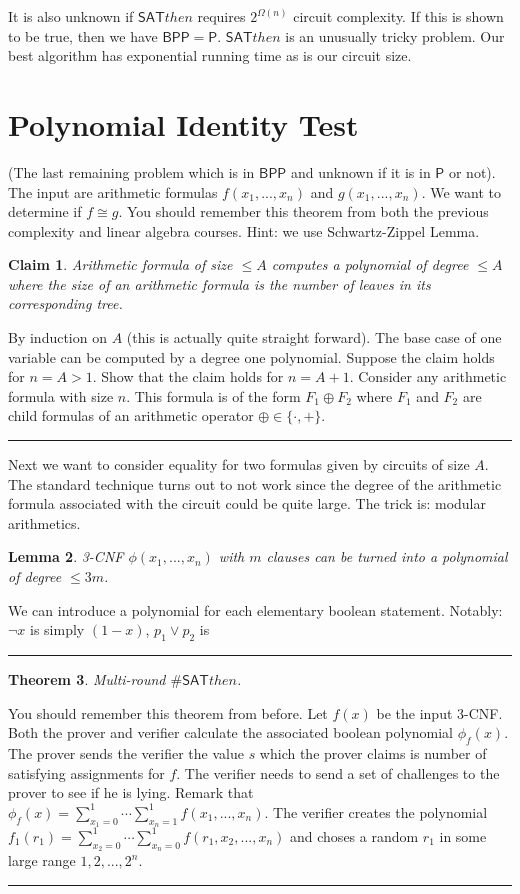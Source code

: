 \documentclass[twoside]{article}
\newcounter{lecnum}
\newtheorem{theorem}{Theorem}[lecnum]
\newtheorem{lemma}[theorem]{Lemma}
\newtheorem{claim}[theorem]{Claim}
\newenvironment{proof}{{\bf Proof:}}{\hfill\rule{2mm}{2mm}}
\def\P{\mathsf{P}}
\def\BPP{\mathsf{BPP}}
\def\SAT{\mathsf{SAT} then }
\begin{document}
It is also unknown if $\SAT$ requires $2^{\Omega(n)}$ circuit complexity. If this is shown to be true, then we have $\BPP = \P$. $\SAT$ is an unusually tricky problem. Our best algorithm has exponential running time as is our circuit size. 

\section{Polynomial Identity Test}
(The last remaining problem which is in $\BPP$ and unknown if it is in $\P$ or not). The input are arithmetic formulas $f(x_1, ..., x_n)$ and $g(x_1, ..., x_n)$. We want to determine if $f \cong g$. You should remember this theorem from both the previous complexity and linear algebra courses. Hint: we use Schwartz-Zippel Lemma. 

\begin{claim}
Arithmetic formula of size $\leq A$ computes a polynomial of degree $\leq A$ where the size of an arithmetic formula is the number of leaves in its corresponding tree. 
\end{claim}
\begin{proof}
By induction on $A$ (this is actually quite straight forward). The base case of one variable can be computed by a degree one polynomial. Suppose the claim holds for $n = A > 1$. Show that the claim holds for $n = A+1$. Consider any arithmetic formula with size $n$. This formula is of the form $F_1 \oplus F_2$ where $F_1$ and $F_2$ are child formulas of an arithmetic operator $\oplus \in \{\cdot, + \}$.
\end{proof}

Next we want to consider equality for two formulas given by circuits of size $A$. The standard technique turns out to not work since the degree of the arithmetic formula associated with the circuit could be quite large. The trick is: modular arithmetics.   


\begin{lemma}
3-CNF $\phi(x_1, ..., x_n)$ with $m$ clauses can be turned into a polynomial of degree $\leq 3m$.
\end{lemma}
\begin{proof}
We can introduce a polynomial for each elementary boolean statement. Notably: $\lnot x$ is simply $(1-x)$, $p_1 \lor p_2$ is $ $  
\end{proof}

\begin{theorem}
Multi-round $\# \SAT$. 
\end{theorem}
\begin{proof}
You should remember this theorem from before. Let $f(x)$ be the input 3-CNF. Both the prover and verifier calculate the associated boolean polynomial $\phi_f(x)$. The prover sends the verifier the value $s$ which the prover claims is number of satisfying assignments for $f$. The verifier needs to send a set of challenges to the prover to see if he is lying. Remark that $\phi_f(x) = \sum_{x_1=0}^{1} \cdots \sum_{x_n=1}^{1} f(x_1, ..., x_n)$. The verifier creates the polynomial $f_1(r_1) = \sum_{x_2=0}^{1}\cdots \sum_{x_n=0}^{1} f(r_1, x_2, ..., x_n)$ and choses a random $r_1$ in some large range ${1, 2, ..., 2^n}$.    
\end{proof}
\end{document}
